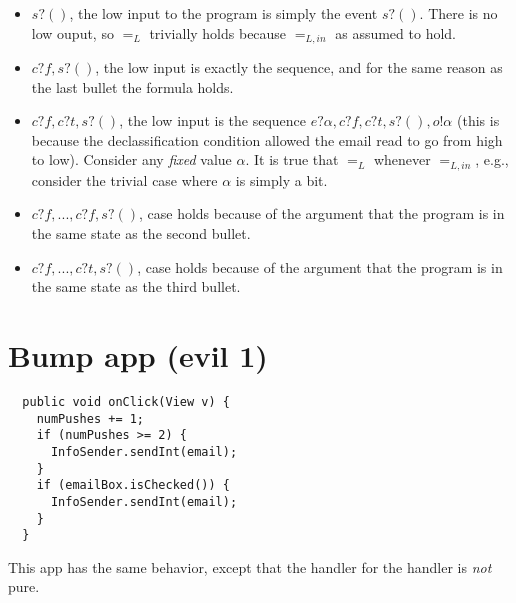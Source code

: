 \documentclass[landscape]{article}
\newcommand{\code}[1]{\text{\lstinline!#1!}}
\begin{document}
\begin{itemize}
\item $s?()$, the low input to the program is simply the event $s?()$.
  There is no low ouput, so $=_L$ trivially holds because $=_{L,in}$
  as assumed to hold.
\item $c?f, s?()$, the low input is exactly the sequence, and for the
  same reason as the last bullet the formula holds.

\item $c?f, c?t, s?()$, the low input is the sequence $e?\alpha, c?f,
  c?t, s?(), o!\alpha$ (this is because the declassification condition
  allowed the email read to go from high to low).  Consider any
  \emph{fixed} value $\alpha$.  It is true that $=_L$ whenever
  $=_{L,in}$, e.g., consider the trivial case where $\alpha$ is simply
  a bit.
\item $c?f, ..., c?f, s?()$, case holds because of the argument that
  the program is in the same state as the second bullet.
\item $c?f, ..., c?t, s?()$, case holds because of the argument that
  the program is in the same state as the third bullet.
\end{itemize}

\section{Bump app (evil 1)}

\begin{lstlisting}
  public void onClick(View v) {
    numPushes += 1;
    if (numPushes >= 2) {
      InfoSender.sendInt(email);
    } 
    if (emailBox.isChecked()) {
      InfoSender.sendInt(email);
    }
  }
\end{lstlisting}

This app has the same behavior, except that the handler for the
\code{onClick} handler is \emph{not} pure.
\end{document}
